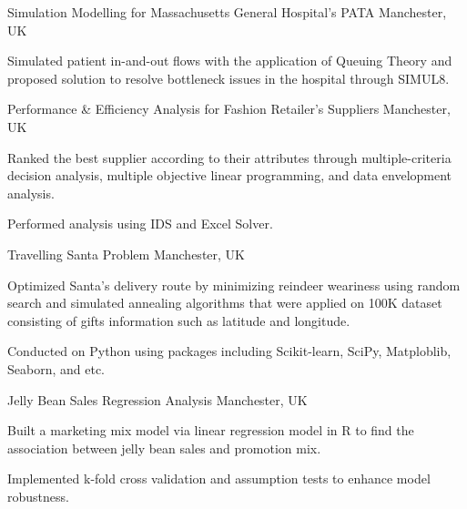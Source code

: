 \begin{cvprojects}
  \cvproject
    {} %
    {Simulation Modelling for Massachusetts General Hospital's PATA} %
    {Manchester, UK} %
    {} %
    {
      \begin{cvitems} %
        \item {Simulated patient in-and-out flows with the application of Queuing Theory and proposed solution to resolve bottleneck issues in the hospital through SIMUL8.}
      \end{cvitems}
    }

  \cvproject
    {} %
    {Performance \& Efficiency Analysis for Fashion Retailer's Suppliers} %
    {Manchester, UK} %
    {} %
    {
      \begin{cvitems} %
        \item {Ranked the best supplier according to their attributes through multiple-criteria decision analysis, multiple objective linear programming, and data envelopment analysis.}
        \item {Performed analysis using IDS and Excel Solver.}
      \end{cvitems}
    }

  \cvproject
    {} %
    {Travelling Santa Problem} %
    {Manchester, UK} %
    {} %
    {
      \begin{cvitems} %
        \item {Optimized Santa's delivery route by minimizing reindeer weariness using random search and simulated annealing algorithms
        that were applied on 100K dataset consisting of gifts information such as latitude and longitude.}
        \item {Conducted on Python using packages including Scikit-learn, SciPy, Matploblib, Seaborn, and etc.}
      \end{cvitems}
    }

  \cvproject
    {} %
    {Jelly Bean Sales Regression Analysis} %
    {Manchester, UK} %
    {} %
    {
      \begin{cvitems} %
        \item {Built a marketing mix model via linear regression model in R to find the association between jelly bean sales and promotion mix.}
        \item {Implemented k-fold cross validation and assumption tests to enhance model robustness.}
      \end{cvitems}
    }


\end{cvprojects}
